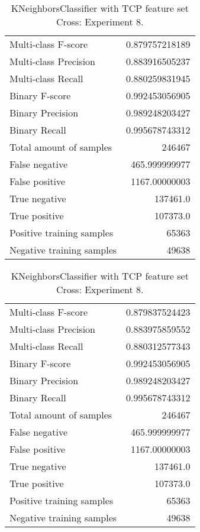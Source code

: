 \begin{table}[H]
\begin{minipage}{0.5\textwidth}
\caption{KNeighborsClassifier with TCP feature set Cross: Experiment 7.}
\centering
\begin{tabular}{l r}
\toprule
Multi-class F-score & 0.879757218189 \\
Multi-class Precision & 0.883916505237 \\
Multi-class Recall & 0.880259831945 \\
\midrule
Binary F-score & 0.992453056905 \\
Binary Precision & 0.989248203427 \\
Binary Recall & 0.995678743312 \\
\midrule
Total amount of samples & 246467 \\
False negative & 465.999999977 \\
False positive & 1167.00000003 \\
True negative & 137461.0 \\
True positive & 107373.0 \\
\midrule
Positive training samples & 65363 \\
Negative training samples & 49638 \\
\bottomrule
\end{tabular}
\end{minipage}
\hfillx
\begin{minipage}{0.5\textwidth}
\caption{KNeighborsClassifier with TCP feature set Cross: Experiment 8.}
\centering
\begin{tabular}{l r}
\toprule
Multi-class F-score & 0.879837524423 \\
Multi-class Precision & 0.883975859552 \\
Multi-class Recall & 0.880312577343 \\
\midrule
Binary F-score & 0.992453056905 \\
Binary Precision & 0.989248203427 \\
Binary Recall & 0.995678743312 \\
\midrule
Total amount of samples & 246467 \\
False negative & 465.999999977 \\
False positive & 1167.00000003 \\
True negative & 137461.0 \\
True positive & 107373.0 \\
\midrule
Positive training samples & 65363 \\
Negative training samples & 49638 \\
\bottomrule
\end{tabular}
\end{minipage}
\end{table}
